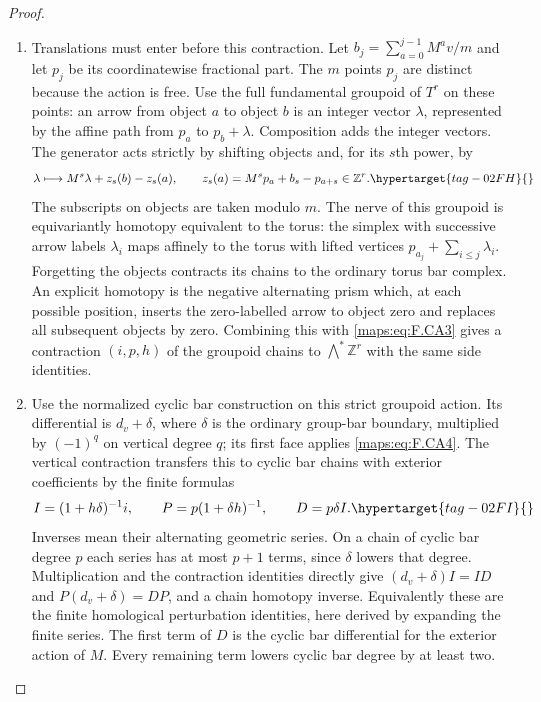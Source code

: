 \documentclass[11pt,a4paper]{article}
\numberwithin{equation}{section}
\theoremstyle{definition}
\begin{document}
\begin{proof}
\begin{enumerate}[label=\arabic*.]
\item Translations must enter before this contraction.  Let
$b_j=\sum_{a=0}^{j-1}M^av/m$ and let $p_j$ be its coordinatewise
fractional part.  The $m$ points $p_j$ are distinct because the
action is free.  Use the full fundamental groupoid of $T^r$
on these points: an arrow from object $a$ to object $b$ is an
integer vector $\lambda$, represented by the affine path from
$p_a$ to $p_b+\lambda$.  Composition adds the integer vectors.
The generator acts strictly by shifting objects and, for its
$s$th power, by
\begin{equation}
 \lambda\longmapsto M^s\lambda+z_s(b)-z_s(a),
 \qquad z_s(a)=M^sp_a+b_s-p_{a+s}\in\mathbb Z^r.             \hypertarget{tag-02FH}{}\label{maps:eq:F.CA4}
\end{equation}
The subscripts on objects are taken modulo $m$.
The nerve of this groupoid is equivariantly homotopy equivalent
to the torus: the simplex with successive arrow labels
$\lambda_i$ maps affinely to the torus with lifted vertices
$p_{a_j}+\sum_{i\leq j}\lambda_i$.
Forgetting the objects contracts its chains to the ordinary
torus bar complex.  An explicit homotopy is the negative
alternating prism which, at each possible position, inserts
the zero-labelled arrow to object zero and replaces all
subsequent objects by zero.  Combining this with \eqref{maps:eq:F.CA3}
gives a contraction $(i,p,h)$ of the groupoid chains to
$\bigwedge^*\mathbb Z^r$ with the same side identities.

\item Use the normalized cyclic bar construction on this strict
groupoid action.  Its differential is $d_v+\delta$, where
$\delta$ is the ordinary group-bar boundary, multiplied by
$(-1)^q$ on vertical degree $q$; its first face applies \eqref{maps:eq:F.CA4}.
The vertical contraction transfers this to cyclic bar chains
with exterior coefficients by the finite formulas
\begin{equation}
 I=(1+h\delta)^{-1}i,\qquad
 P=p(1+\delta h)^{-1},\qquad D=p\delta I.                  \hypertarget{tag-02FI}{}\label{maps:eq:F.CA5}
\end{equation}
Inverses mean their alternating geometric series.  On a chain
of cyclic bar degree $p$ each series has at most $p+1$ terms,
since $\delta$ lowers that degree.  Multiplication and the
contraction identities directly give $(d_v+\delta)I=ID$ and
$P(d_v+\delta)=DP$,
and a chain homotopy inverse.  Equivalently these are the
finite homological perturbation identities, here derived by
expanding the finite series.  The first term of $D$ is the
cyclic bar differential for the exterior action of $M$.
Every remaining term lowers cyclic bar degree by at least two.


\end{enumerate}
\end{proof}
\end{document}
